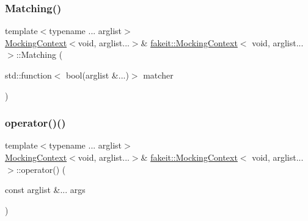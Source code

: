 \subsubsection{\texorpdfstring{Matching()}{Matching()}\hspace{0.1cm}{\footnotesize\ttfamily [9/9]}}
{\footnotesize\ttfamily template$<$typename ... arglist$>$ \\
\mbox{\hyperlink{classfakeit_1_1MockingContext}{Mocking\+Context}}$<$void, arglist...$>$\& \mbox{\hyperlink{classfakeit_1_1MockingContext}{fakeit\+::\+Mocking\+Context}}$<$ void, arglist... $>$\+::Matching (\begin{DoxyParamCaption}\item[{std\+::function$<$ bool(arglist \&...)$>$}]{matcher }\end{DoxyParamCaption})\hspace{0.3cm}{\ttfamily [inline]}}

\mbox{\label{classfakeit_1_1MockingContext_3_01void_00_01arglist_8_8_8_01_4_a73476d376f7ec5631ba9a37ff5264599}} 
\subsubsection{\texorpdfstring{operator()()}{operator()()}\hspace{0.1cm}{\footnotesize\ttfamily [1/18]}}
{\footnotesize\ttfamily template$<$typename ... arglist$>$ \\
\mbox{\hyperlink{classfakeit_1_1MockingContext}{Mocking\+Context}}$<$void, arglist...$>$\& \mbox{\hyperlink{classfakeit_1_1MockingContext}{fakeit\+::\+Mocking\+Context}}$<$ void, arglist... $>$\+::operator() (\begin{DoxyParamCaption}\item[{const arglist \&...}]{args }\end{DoxyParamCaption})\hspace{0.3cm}{\ttfamily [inline]}}

\mbox{\label{classfakeit_1_1MockingContext_3_01void_00_01arglist_8_8_8_01_4_a1a5a55569a763877d395635979e6b3d6}} 
